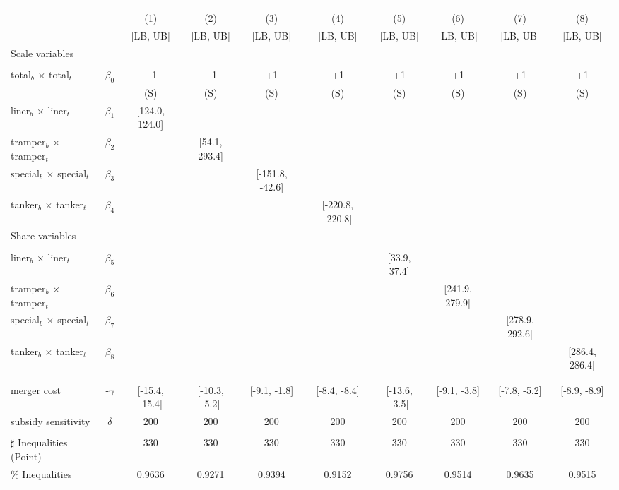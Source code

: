 \begin{tabular}{@{\extracolsep{5pt}}lccccccccc}
\toprule 
 &  &  &  &  &  &  &  &  &  \\
 &  & (1) & (2) & (3) & (4) & (5) & (6) & (7) & (8) \\
 &  & [LB, UB] & [LB, UB] & [LB, UB] & [LB, UB] & [LB, UB] & [LB, UB] & [LB, UB] & [LB, UB] \\
\midrule 
Scale variables &  &  &  &  &  &  &  \\
 &  &  &  &  &  &  &  &  \\
total$_{b}$ $\times$ total$_{t}$ & $\beta_0$ & +1 & +1 & +1 & +1 & +1 & +1 & +1 & +1 \\
 &  & (S) & (S) & (S) & (S) & (S) & (S) & (S) & (S) \\
liner$_{b}$ $\times$ liner$_{t}$ & $\beta_1$ & [124.0, 124.0] &  &  &  &  &  &  &  \\
tramper$_{b}$ $\times$ tramper$_{t}$ & $\beta_2$ &  & [54.1, 293.4] &  &  &  &  &  &  \\
special$_{b}$ $\times$ special$_{t}$ & $\beta_3$ &  &  & [-151.8, -42.6] &  &  &  &  &  \\
tanker$_{b}$ $\times$ tanker$_{t}$ & $\beta_4$ &  &  &  & [-220.8, -220.8] &  &  &  &  \\
Share variables &  &  &  &  &  &  &  &  &  \\
 &  &  &  &  &  &  &  &  &  \\
liner$_{b}$ $\times$ liner$_{t}$ & $\beta_5$ &  &  &  &  & [33.9, 37.4] &  &  &  \\
tramper$_{b}$ $\times$ tramper$_{t}$ & $\beta_6$ &  &  &  &  &  & [241.9, 279.9] &  &  \\
special$_{b}$ $\times$ special$_{t}$ & $\beta_7$ &  &  &  &  &  &  & [278.9, 292.6] &  \\
tanker$_{b}$ $\times$ tanker$_{t}$ & $\beta_8$ &  &  &  &  &  &  &  & [286.4, 286.4] \\
 &  &  &  &  &  &  &  &  &  \\
 &  &  &  &  &  &  &  &  &  \\
merger cost & -$\gamma$ & [-15.4, -15.4] & [-10.3, -5.2] & [-9.1, -1.8] & [-8.4, -8.4] & [-13.6, -3.5] & [-9.1, -3.8] & [-7.8, -5.2] & [-8.9, -8.9] \\
subsidy sensitivity & $\delta$ & 200 & 200 & 200 & 200 & 200 & 200 & 200 & 200 \\
 &  &  &  &  &  &  &  &  &  \\
\hline 
$\sharp$ Inequalities (Point) &  & 330 & 330 & 330 & 330 & 330 & 330 & 330 & 330 \\
\% Inequalities &  & 0.9636 & 0.9271 & 0.9394 & 0.9152 & 0.9756 & 0.9514 & 0.9635 & 0.9515 \\
\bottomrule 
\end{tabular}
